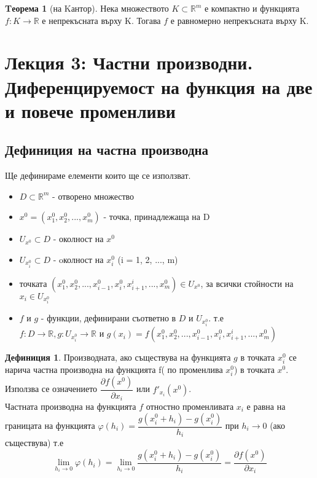 \documentclass[a4paper,fleqn,12pt]{article}
\theoremstyle{definition}
\newtheorem{theorem}{Tеорема}[subsection]
\newtheorem{definition}{Дефиниция}[subsection]
\begin{document}
\begin{theorem}[на Kантор]
Нека множеството $K \subset \mathbb{R}^m$ е компактно и функцията $f: K \to \mathbb{R}$ е непрекъсната върху K. Тогава $f$ е равномерно непрекъсната върху K.
\end{theorem}


\newpage

\section{Лекция 3: Частни производни. Диференцируемост на функция на две и повече променливи}
 
\subsection{Дефиниция на частна производна}
Ще дефинираме елементи които ще се използват. 
\begin{itemize}
	\item $D \subset \mathbb{R}^m$ -  отворено множество
	\item $x^0 = (x_1 ^ 0, x_2 ^ 0, ... , x_m ^ 0)$ - точка, принадлежаща на D
	\item $U_{x^0} \subset D$ - околност на $x^0$
	\item $U_{x_i ^ 0} \subset D$ - oколност на $x_i ^ 0$ (i  = 1, 2, ..., m)
	\item точката $(x_1 ^ 0, x_2 ^ 0, ..., x_{i-1}^0, x_i ^ 0, x_{i+1} ^i, ..., x_m ^ 0) \in U_{x^0}$, за всички стойности на $x_i \in U_{x_i ^ 0}$
	\item $f$ и $g$ - функции, дефинирани съответно в $D$ и $U_{x_i ^ 0}$. т.е \\
$f: D \to \mathbb{R} , g: U_{x_i ^ 0} \to \mathbb{R}$ и $g(x_i) = f(x_1 ^ 0, x_2 ^ 0, ..., x_{i-1}^0, x_i ^ 0, x_{i+1} ^i, ..., x_m ^ 0)$
\end{itemize}
 
\begin{definition}
Производната, ако съществува на функцията $g$ в точката $x_i ^ 0$ се нарича частна производна на функцията f( по променлива  $x_i ^ 0$) в точката $x^0$. Използва се означението $\dfrac {\partial f(x^0)}{\partial x_i}$ или $f'_{x_i} (x^0)$. \\
Частната производна на функцията $f$ отностно променливата $x_i$ е равна на границата на функцията $\varphi (h_i)  = \dfrac{g(x_i ^0 + h_i) - g(x_i ^ 0)}{h_i}$ при $h_i \to 0$ (ако съществува) т.е
$$\lim_{h_i \to 0} \varphi (h_i) = \lim_{h_i \to 0} \dfrac{g(x_i ^0 + h_i) - g(x_i ^ 0)}{h_i} = \dfrac {\partial f(x^0)}{\partial x_i}$$
\end{definition}
\end{document}
